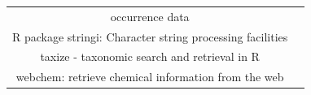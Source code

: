 \documentclass[journal,datadescriptor,accept,moreauthors,pdftex]{Definitions/mdpi}
\begin{document}
\begin{table}[H]
\begin{tabular}{cc}
occurrence data} \\ R package stringi: Character string processing facilities & \citep{R-R package stringi} \\ taxize - taxonomic search and retrieval in R & \citep{R-taxize - taxonomic search and retrieval in R} \\ webchem:  retrieve chemical information from the web & \citep{R-webchem}
\\
\bottomrule
\end{tabular}
\end{table}






\end{document}
